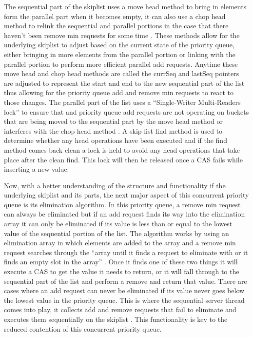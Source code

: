 \documentclass[10pt]{asme2ej}
\begin{document}
The sequential part of the skiplist uses a move head method to bring in elements form the parallel part when it becomes empty, it can also use a chop head method to relink the sequential and parallel portions in the case that there haven’t been remove min requests for some time \cite{latex}. These methods allow for the underlying skiplist to adjust based on the current state of the priority queue, either bringing in more elements from the parallel portion or linking with the parallel portion to perform more efficient parallel add requests. Anytime these move head and chop head methods are called the currSeq and lastSeq pointers are adjusted to represent the start and end to the new sequential part of the list thus allowing for the priority queue add and remove min requests to react to those changes. The parallel part of the list uses a “Single-Writer Multi-Readers lock” to ensure that and priority queue add requests are not operating on buckets that are being moved to the sequential part by the move head method or interferes with the chop head method \cite{latex}. A skip list find method is used to determine whether any head operations have been executed and if the find method comes back clean a lock is held to avoid any head operations that take place after the clean find. This lock will then be released once a CAS fails while inserting a new value.

Now, with a better understanding of the structure and functionality if the underlying skiplist and its parts, the next major aspect of this concurrent priority queue is its elimination algorithm. In this priority queue, a remove min request can always be eliminated but if an add request finds its way into the elimination array it can only be eliminated if its value is less than or equal to the lowest value of the sequential portion of the list. The algorithm works by using an elimination array in which elements are added to the array and a remove min request searches through the “array until it finds a request to eliminate with or it finds an empty slot in the array” \cite{latex}. Once it finds one of these two things it will execute a CAS to get the value it needs to return, or it will fall through to the sequential part of the list and perform a remove and return that value. There are cases where an add request can never be eliminated if its value never goes below the lowest value in the priority queue. This is where the sequential server thread comes into play, it collects add and remove requests that fail to eliminate and executes them sequentially on the skiplist \cite{latex}. This functionality is key to the reduced contention of this concurrent priority queue.
\linebreak
\linebreak
\linebreak
\linebreak
\linebreak
\linebreak
\end{document}
